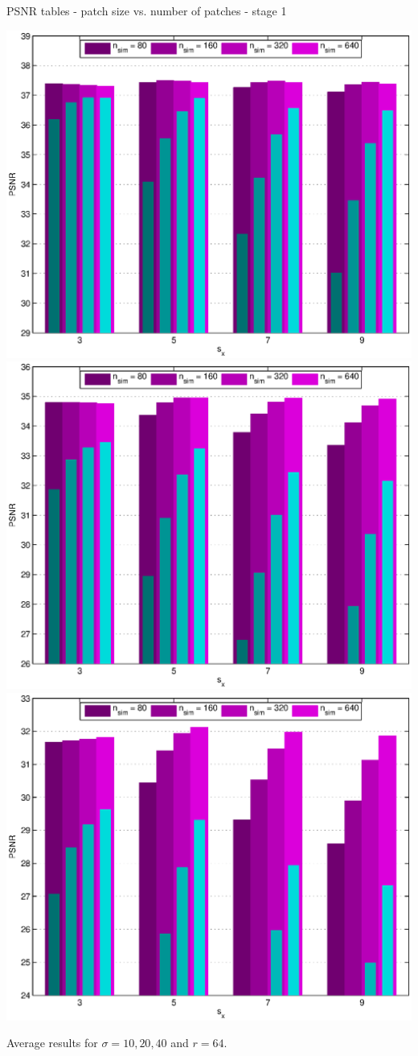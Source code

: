\documentclass[mathserif, 8pt]{beamer}
\makeatletter
\newcounter{multipleslide}
\newcommand{\restoreframe}{%
\patchcmd{\beamer@@tmpl@footline}%
	{\themultipleslide}%
	{\insertframenumber}%
	{}%
	{}%
\setcounter{framenumber}{\value{multipleslide}}%
}
\makeatother
\begin{document}
\begin{frame}{PSNR tables - patch size vs. number of patches - stage 1}
	\begin{center}
		\includegraphics[width=.33\textwidth]{psnr_px1-np1-bars_1r64_s10_average.eps}%
		\includegraphics[width=.33\textwidth]{psnr_px1-np1-bars_1r64_s20_average.eps}%
		\includegraphics[width=.33\textwidth]{psnr_px1-np1-bars_1r64_s40_average.eps}
	\end{center}
	\begin{center}
	Average results for $\sigma = 10, 20, 40$ and $r = 64$.
	\end{center}
\end{frame}
\restoreframe
\end{document}
